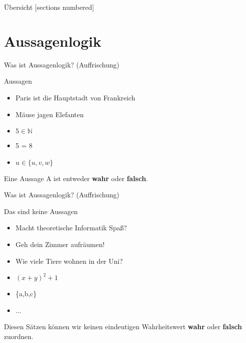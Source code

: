 \documentclass[10pt]{beamer}
\begin{document}
\maketitle

\begin{frame}[fragile]{Übersicht}
  [sections numbered]
  \tableofcontents
\end{frame}

\section{Aussagenlogik}

\begin{frame}[fragile]{Was ist Aussagenlogik? (Auffrischung)}
    \begin{alertblock}{Aussagen}
    \begin{itemize}
        \item Paris ist die Hauptstadt von Frankreich
        \item Mäuse jagen Elefanten
        \item $5 \in \mathbb{N}$
        \item 5 = 8
        \item $u \in \{u, v, w\}$
    \end{itemize}
    \end{alertblock}
    Eine Aussage A ist entweder \textbf{wahr} oder \textbf{falsch}.
\end{frame}

\begin{frame}[fragile]{Was ist Aussagenlogik? (Auffrischung)}
    \begin{alertblock}{Das sind keine Aussagen}
    \begin{itemize}
        \item Macht theoretische Informatik Spaß?
        \item Geh dein Zimmer aufräumen!
        \item Wie viele Tiere wohnen in der Uni?
        \item $(x+y)^2+1$
        \item \{a,b,c\}
        \item ...
    \end{itemize}
    \end{alertblock}
    Diesen Sätzen können wir keinen eindeutigen Wahrheitswert \textbf{wahr} oder \textbf{falsch} zuordnen.
\end{frame}
\end{document}
